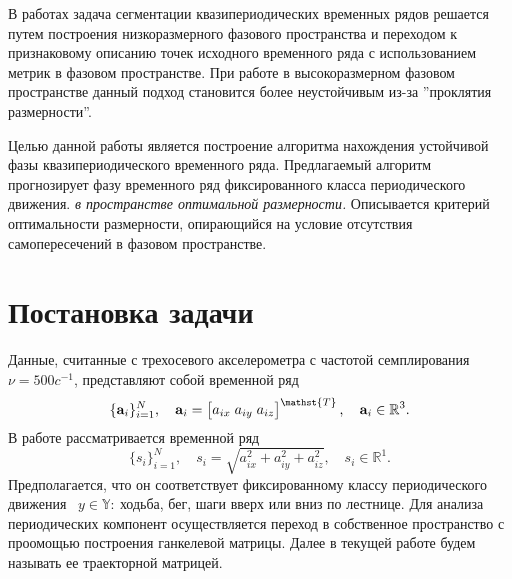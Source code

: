 \documentclass[12pt, twoside]{article}
\theoremstyle{definition}
\def\RR{\mathbb R}
\begin{document}
В работах \cite{ignatov2016human, grabovoy2020quasi} задача сегментации квазипериодических временных рядов решается путем построения низкоразмерного фазового пространства и переходом к признаковому описанию точек исходного временного ряда с использованием метрик в фазовом пространстве. При работе в высокоразмерном фазовом пространстве данный подход становится более неустойчивым из-за ''проклятия размерности''. 

Целью данной работы является построение алгоритма нахождения устойчивой фазы квазипериодического временного ряда. Предлагаемый алгоритм прогнозирует фазу временного ряд фиксированного класса  периодического движения. \emph{в пространстве оптимальной размерности.} Описывается критерий оптимальности размерности, опирающийся на условие отсутствия самопересечений в фазовом пространстве.


\section{Постановка задачи}
Данные, считанные с трехосевого акселерометра с частотой семплирования $\nu = 500 c^{-1}$, представляют собой временной ряд 
    \begin{equation}\label{ts_3}
        \{ \mathbf{a}_i \}_{i = 1}^{N}, \quad \mathbf{a}_i = \begin{bmatrix}a_{ix}\;a_{iy}\;a_{iz}\end{bmatrix}^{\mathst{T}},\quad \mathbf{a}_i \in \RR^3.
    \end{equation}
В работе рассматривается временной ряд
    \begin{equation}\label{ts}
        \{ s_i \}_{i = 1}^{N}, \quad s_i = \sqrt{a_{ix}^2 + a_{iy}^2 + a_{iz}^2},\quad s_i \in \RR^1.
    \end{equation}    
Предполагается, что он соответствует фиксированному классу периодического движения~ $y\in\mathbb{Y}:\:$ходьба, бег, шаги вверх или вниз по лестнице. Для анализа периодических компонент осуществляется переход в собственное пространство с проомощью построения ганкелевой матрицы. Далее в текущей работе будем называть ее траекторной матрицей.
\end{document}
